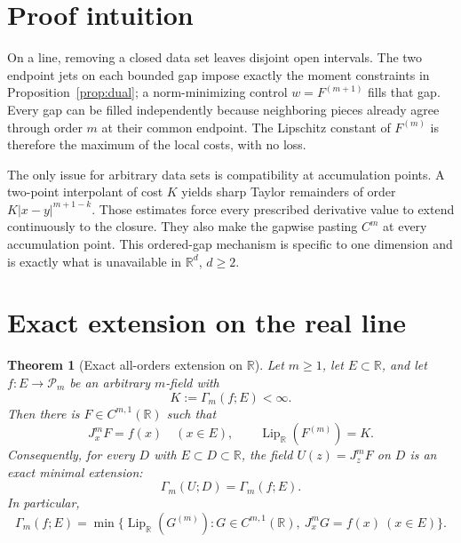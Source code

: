 \documentclass[11pt]{article}
\newtheorem{theorem}{Theorem}
\newcommand{\R}{\mathbb R}
\newcommand{\Pm}{\mathcal P_m}
\newcommand{\Lip}{\operatorname{Lip}}
\newcommand{\J}{J}
\begin{document}
\section{Proof intuition}

On a line, removing a closed data set leaves disjoint open intervals.  The
two endpoint jets on each bounded gap impose exactly the moment constraints
in Proposition~\ref{prop:dual}; a norm-minimizing control $w=F^{(m+1)}$
fills that gap.  Every gap can be filled independently because neighboring
pieces already agree through order $m$ at their common endpoint.  The
Lipschitz constant of $F^{(m)}$ is therefore the maximum of the local costs,
with no loss.

The only issue for arbitrary data sets is compatibility at accumulation
points.  A two-point interpolant of cost $K$ yields sharp Taylor remainders
of order $K|x-y|^{m+1-k}$.  Those estimates force every prescribed
derivative value to extend continuously to the closure.  They also make the
gapwise pasting $C^m$ at every accumulation point.  This ordered-gap
mechanism is specific to one dimension and is exactly what is unavailable
in $\R^d$, $d\geq2$.

\section{Exact extension on the real line}

\begin{theorem}[Exact all-orders extension on $\R$]\label{thm:extension}
Let $m\geq1$, let $E\subset\R$, and let $f:E\to\Pm$ be an arbitrary
$m$-field with
\[
 K:=\Gamma_m(f;E)<\infty.
\]
Then there is $F\in C^{m,1}(\R)$ such that
\begin{equation}\label{eq:exact}
 \J_x^mF=f(x)\quad(x\in E),\qquad
 \Lip_{\R}(F^{(m)})=K.
\end{equation}
Consequently, for every $D$ with $E\subset D\subset\R$, the field
$U(z)=\J_z^mF$ on $D$ is an exact minimal extension:
\[
 \Gamma_m(U;D)=\Gamma_m(f;E).
\]
In particular,
\begin{equation}\label{eq:traceidentity}
 \Gamma_m(f;E)=
 \min\{\Lip_{\R}(G^{(m)}):G\in C^{m,1}(\R),\ 
 \J_x^mG=f(x)\ (x\in E)\}.
\end{equation}
\end{theorem}
\end{document}
